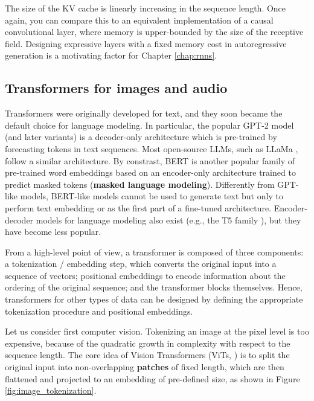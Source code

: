The size of the KV cache is linearly increasing in the sequence length. Once again, you can compare this to an equivalent implementation of a causal convolutional layer, where memory is upper-bounded by the size of the receptive field. Designing expressive layers with a fixed memory cost in autoregressive generation is a motivating factor for Chapter \ref{chap:rnns}.

\subsection{Transformers for images and audio} \addteacup
\label{subsec:transformers_image_audio}

Transformers were originally developed for text, and they soon became the default choice for language modeling. In particular, the popular GPT-2 model \cite{radford2019language} (and later variants) is a decoder-only architecture which is pre-trained by forecasting tokens in text sequences. Most open-source LLMs, such as LLaMa \cite{touvron2023llama}, follow a similar architecture. By constrast, BERT \cite{devlin2018bert} is another popular family of pre-trained word embeddings based on an encoder-only architecture trained to predict masked tokens (\textbf{masked language modeling}). Differently from GPT-like models, BERT-like models cannot be used to generate text but only to perform text embedding or as the first part of a fine-tuned architecture. Encoder-decoder models for language modeling also exist (e.g., the T5 family \cite{raffel2020exploring}), but they have become less popular.

From a high-level point of view, a transformer is composed of three components: a tokenization / embedding step, which converts the original input into a sequence of vectors; positional embeddings to encode information about the ordering of the original sequence; and the transformer blocks themselves. Hence, transformers for other types of data can be designed by defining the appropriate tokenization procedure and positional embeddings.

Let us consider first computer vision. Tokenizing an image at the pixel level is too expensive, because of the quadratic growth in complexity with respect to the sequence length. The core idea of Vision Transformers (ViTs, \cite{dosovitskiy2020image}) is to split the original input into non-overlapping \textbf{patches} of fixed length, which are then flattened and projected to an embedding of pre-defined size, as shown in Figure \ref{fig:image_tokenization}.

